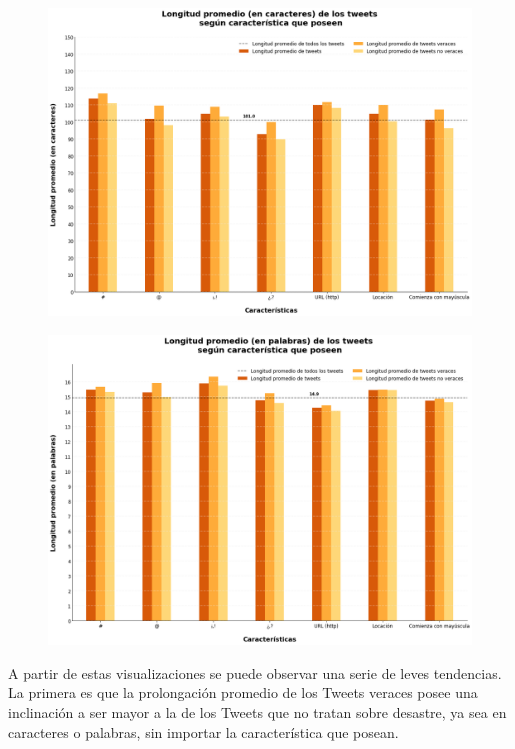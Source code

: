 \documentclass[titlepage,a4paper]{article}
\begin{document}
    \begin{figure}[H]
    \centering
    \includegraphics[width=1\textwidth]{graficos/Analisis Lexico Grafico/long_promedio_char_tweets_segun_caracteristica.png}
    \caption{} 
    \end{figure}
    
    \begin{figure}[H]
    \centering
    \includegraphics[width=1\textwidth]{graficos/Analisis Lexico Grafico/long_prom_words_tweets_segun_caracteristicas.png}
    \caption{} 
    \end{figure}
    
    A partir de estas visualizaciones se puede observar una serie de leves tendencias. La primera es que la prolongación promedio de los Tweets veraces posee una inclinación a ser mayor a la de los Tweets que no tratan sobre desastre, ya sea en caracteres o palabras, sin importar la característica que posean.
    
\end{document}
